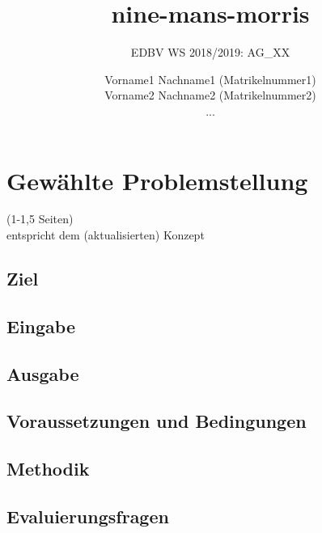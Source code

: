 \documentclass[paper=A4, deutsch]{scrartcl}
\begin{document}

\title{nine-mans-morris} %

\subtitle{EDBV WS 2018/2019: AG\_XX} %


\author{Vorname1 Nachname1 (Matrikelnummer1)\\
Vorname2 Nachname2 (Matrikelnummer2)\\
...}




\maketitle


\section{Gewählte Problemstellung}
(1-1,5 Seiten)\\
entspricht dem (aktualisierten) Konzept
\subsection{Ziel}
\subsection{Eingabe}
\subsection{Ausgabe}
\subsection{Voraussetzungen und Bedingungen}
\subsection{Methodik}
\subsection{Evaluierungsfragen}
\end{document}
